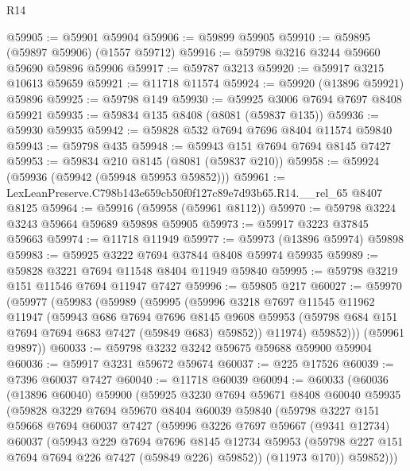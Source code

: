 \begin{lexlean}{R14}
\begin{coremodule}
@59905 := @59901 @59904
@59906 := @59899 @59905
@59910 := @59895 (@59897 @59906) (@1557 @59712)
@59916 := @59798 @3216 @3244 @59660 @59690 @59896 @59906
@59917 := @59787 @3213
@59920 := @59917 @3215 @10613 @59659
@59921 := @11718 @11574
@59924 := @59920 (@13896 @59921) @59896
@59925 := @59798 @149
@59930 := @59925 @3006 @7694 @7697 @8408 @59921
@59935 := @59834 @135 @8408 (@8081 (@59837 @135))
@59936 := @59930 @59935
@59942 := @59828 @532 @7694 @7696 @8404 @11574 @59840
@59943 := @59798 @435
@59948 := @59943 @151 @7694 @7694 @8145 @7427
@59953 := @59834 @210 @8145 (@8081 (@59837 @210))
@59958 := @59924 (@59936 (@59942 (@59948 @59953 @59852)))
@59961 := LexLeanPreserve.C798b143e659cb50f0f127c89e7d93b65.R14.__rel_65 @8407 @8125
@59964 := @59916 (@59958 (@59961 @8112))
@59970 := @59798 @3224 @3243 @59664 @59689 @59898 @59905
@59973 := @59917 @3223 @37845 @59663
@59974 := @11718 @11949
@59977 := @59973 (@13896 @59974) @59898
@59983 := @59925 @3222 @7694 @37844 @8408 @59974 @59935
@59989 := @59828 @3221 @7694 @11548 @8404 @11949 @59840
@59995 := @59798 @3219 @151 @11546 @7694 @11947 @7427
@59996 := @59805 @217
@60027 := @59970
    (@59977
      (@59983
        (@59989
          (@59995
            (@59996
              @3218
              @7697
              @11545
              @11962
              @11947
              (@59943
                @686
                @7694
                @7696
                @8145
                @9608
                @59953
                (@59798 @684 @151 @7694 @7694 @683 @7427 (@59849 @683) @59852))
              @11974)
            @59852)))
      (@59961 @9897))
@60033 := @59798 @3232 @3242 @59675 @59688 @59900 @59904
@60036 := @59917 @3231 @59672 @59674
@60037 := @225 @17526
@60039 := @7396 @60037 @7427
@60040 := @11718 @60039
@60094 := @60033
    (@60036
      (@13896 @60040)
      @59900
      (@59925
        @3230
        @7694
        @59671
        @8408
        @60040
        @59935
        (@59828
          @3229
          @7694
          @59670
          @8404
          @60039
          @59840
          (@59798
            @3227
            @151
            @59668
            @7694
            @60037
            @7427
            (@59996
              @3226
              @7697
              @59667
              (@9341 @12734)
              @60037
              (@59943
                @229
                @7694
                @7696
                @8145
                @12734
                @59953
                (@59798 @227 @151 @7694 @7694 @226 @7427 (@59849 @226) @59852))
              (@11973 @170))
            @59852)))

\end{coremodule}
\end{lexlean}
